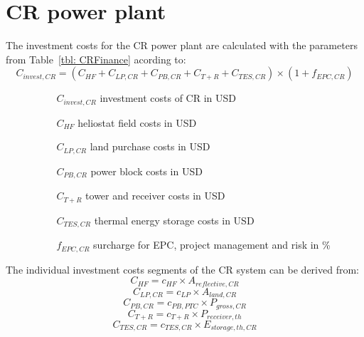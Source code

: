 \section{CR power plant}
The investment costs for the CR power plant are calculated with the parameters from Table~\ref{tbl: CRFinance} acording to:
\begin{equation}
C_{invest,CR} = (C_{HF}+C_{LP,CR}+C_{PB,CR}+C_{T+R}+C_{TES,CR})\times(1+f_{EPC,CR}) \label{GL_CRInvest}
\end{equation} 
\begin{itemize}
\item[ ] 
\begin{itemize}
\item[ ] 
\begin{itemize}
\item[$C_{invest,CR}$]investment costs of CR in USD
\item[$C_{HF}$]heliostat field costs in USD
\item[$C_{LP,CR}$]land purchase costs in USD
\item[$C_{PB,CR}$]power block costs in USD
\item[$C_{T+R}$]tower and receiver costs in USD
\item[$C_{TES,CR}$]thermal energy storage costs in USD
\item[$f_{EPC,CR}$]surcharge for EPC, project management and risk in \%
\end{itemize}
\end{itemize}
\end{itemize}
The individual investment costs segments of the CR system can be derived from:
\begin{equation}
C_{HF} = c_{HF} \times A_{reflective,CR}
\end{equation} 
\begin{equation}
C_{LP,CR} = c_{LP} \times A_{land,CR}
\end{equation} 
\begin{equation}
C_{PB,CR} = c_{PB,PTC} \times P_{gross,CR}
\end{equation} 
\begin{equation}
C_{T+R} = c_{T+R} \times P_{receiver,th}
\end{equation} 
\begin{equation}
C_{TES,CR} = c_{TES,CR} \times E_{storage,th,CR}
\end{equation} 
